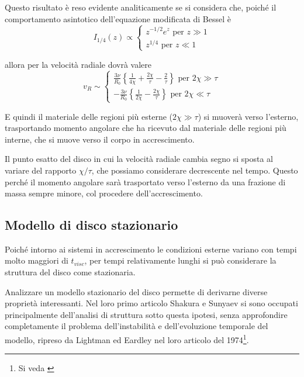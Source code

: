 \documentclass[a4paperbi]{article}
\begin{document}
	Questo risultato è reso evidente analiticamente se si considera che, poiché il comportamento asintotico dell'equazione modificata di Bessel è
	\begin{equation*}
		I_{1/4}(z)\propto\begin{cases}
				z^{-1/2}e^z\text{ per $z\gg1$}\\
				z^{1/4}\text{ per $z\ll1$}
			\end{cases}
	\end{equation*}
	 
	allora per la velocità radiale dovrà valere
	\begin{equation*}
		v_R\sim\begin{cases}
			\frac{3\nu}{R_0}\left\{\frac{1}{4\chi}+\frac{2\chi}{\tau}-\frac{2}{\tau}\right\}\text{ per $2\chi\gg\tau$}\\
			-\frac{3\nu}{R_0}\left\{\frac{1}{2\chi}-\frac{2\chi}{\tau}\right\}\text{ per $2\chi\ll\tau$}			
			\end{cases}
	\end{equation*}
	
	E quindi il materiale delle regioni più esterne ($2\chi\gg\tau$) si muoverà verso l'esterno, trasportando momento angolare che ha ricevuto dal materiale delle regioni più interne, che si muove verso il corpo in accrescimento.
	
	Il punto esatto del disco in cui la velocità radiale cambia segno si sposta al variare del rapporto $\chi/\tau$, che possiamo considerare decrescente nel tempo. Questo perché il momento angolare sarà trasportato verso l'esterno da una frazione di massa sempre minore, col procedere dell'accrescimento.
	
\subsection{Modello di disco stazionario}
	Poiché intorno ai sistemi in accrescimento le condizioni esterne variano con tempi molto maggiori di $t_{visc}$, per tempi relativamente lunghi si può considerare la struttura del disco come stazionaria.
	
	Analizzare un modello stazionario del disco permette di derivarne diverse proprietà interessanti. Nel loro primo articolo Shakura e Sunyaev si sono occupati principalmente dell'analisi di struttura sotto questa ipotesi, senza approfondire completamente il problema dell'instabilità e dell'evoluzione temporale del modello, ripreso da Lightman ed Eardley nel loro articolo del 1974\footnote{Si veda \cite{LightmanEardley1974}}.
	
\end{document}
